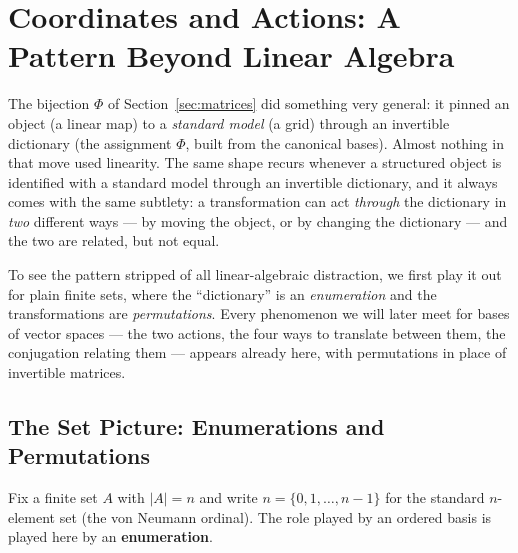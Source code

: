 
\newpage
\section{Coordinates and Actions: A Pattern Beyond Linear Algebra}
\label{sec:coordinates-and-actions}

\begin{intuition}
    The bijection $\Phi$ of Section~\ref{sec:matrices} did something very general: it pinned an object (a
    linear map) to a \emph{standard model} (a grid) through an invertible dictionary (the assignment
    $\Phi$, built from the canonical bases). Almost nothing in that move used linearity. The same shape recurs
    whenever a structured object is identified with a standard model through an invertible dictionary,
    and it always comes with the same subtlety: a transformation can act \emph{through} the dictionary
    in \emph{two} different ways --- by moving the object, or by changing the dictionary --- and the two
    are related, but not equal.

    To see the pattern stripped of all linear-algebraic distraction, we first play it out for plain
    finite sets, where the ``dictionary'' is an \emph{enumeration} and the transformations are
    \emph{permutations}. Every phenomenon we will later meet for bases of vector spaces --- the two
    actions, the four ways to translate between them, the conjugation relating them --- appears already
    here, with permutations in place of invertible matrices.
\end{intuition}

\subsection{The Set Picture: Enumerations and Permutations}
\label{subsec:set-picture}

Fix a finite set $A$ with $|A| = n$ and write $n = \{0, 1, \dots, n-1\}$ for the standard $n$-element
set (the von Neumann ordinal). The role played by an ordered basis is played here by an
\textbf{enumeration}.

